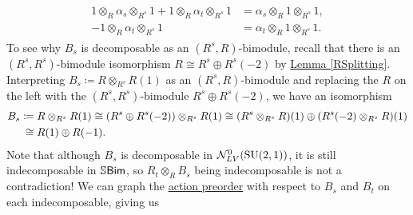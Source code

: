 \begin{example}
\begin{align*}
\begin{split}
1 \otimes_R \alpha_s \otimes_{R^s} 1 + 1 \otimes_R \alpha_t \otimes_{R^s} 1 &= \alpha_s \otimes_R 1 \otimes_{R^s} 1,\\
-1 \otimes_R \alpha_t \otimes_{R^s} 1 &= \alpha_t  \otimes_R 1 \otimes_{R^s} 1.
\end{split}
\end{align*}
\noindent To see why $B_s$ is decomposable as an $(R^s, R)$-bimodule, recall that there is an $(R^s, R^s)$-bimodule isomorphism $R \cong R^s \oplus R^s(-2)$ by \hyperref[RSplitting]{Lemma \ref*{RSplitting}}. Interpreting $B_s \coloneqq R \otimes_{R^s} R(1)$ as an $(R^s, R)$-bimodule and replacing the $R$ on the left with the $(R^s, R^s)$-bimodule $R^s \oplus R^s(-2)$, we have an %
isomorphism
\begin{align*}
\begin{split}
B_s &\coloneqq R \otimes_{R^s} R(1) \cong (R^s \oplus R^s(-2)) \otimes_{R^s} R(1) \cong (R^s \otimes_{R^s} R)(1) \oplus (R^s(-2) \otimes_{R^s} R)(1)\\
&\hphantom{\coloneqq}\nhphantom{$\cong$}\cong R(1) \oplus R(-1).
\end{split}
\end{align*}
\noindent Note that although $B_s$ is decomposable in $\mathcal{N}_{LV}^0(\textup{SU}(2, 1))$, it is still indecomposable in $\mathbb{S}\textup{\textsf{Bim}}$, so $R_t \otimes_R B_s$ being indecomposable is not a contradiction! We can graph the \hyperref[ActionPreorder]{action preorder} with respect to $B_s$ and $B_t$ on each indecomposable, giving us\\[5\linespacing]
\begin{center}
\end{center}
\end{example}
